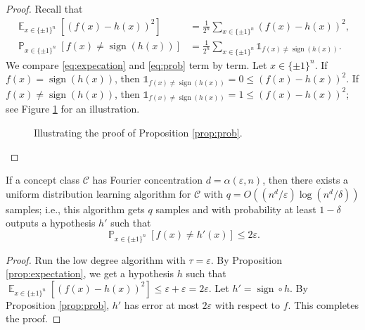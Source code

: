 \documentclass[letterpaper, reqno,11pt]{article}
\newcommand{\PP}{\mathop{{}\mathbb{P}}}
\newcommand{\EE}{\mathop{{}\mathbb{E}}}
\DeclareMathOperator{\sign}{sign}
\begin{document}
\begin{proof}
  Recall that
  \begin{align}
    \EE_{x \in \{ \pm 1 \}^n}\left[(f(x) - h(x))^2\right] &= \frac{1}{2^n} \sum_{x \in \{ \pm 1 \}^n} (f(x) - h(x))^2, \label{eq:expecation} \\
    \PP_{x \in \{ \pm 1 \}^n} \left[f(x) \neq \sign(h(x))\right] &= \frac{1}{2^n} \sum_{x \in \{ \pm 1 \}^n} \mathds 1_{f(x) \neq \sign(h(x))}. \label{eq:prob}
  \end{align}
  We compare \eqref{eq:expecation} and \eqref{eq:prob} term by term. Let $x \in \{ \pm 1 \}^n$. If $f(x) = \sign(h(x))$, then $\mathds 1_{f(x) \neq \sign(h(x))} = 0 \leq (f(x) - h(x))^2$. If $f(x) \neq \sign(h(x))$, then $\mathds 1_{f(x) \neq \sign(h(x))} = 1 \leq (f(x) - h(x))^2$; see Figure \ref{fig:proof-prob} for an illustration.

  \begin{figure}[h]
    \centering
    \caption{Illustrating the proof of Proposition \ref{prop:prob}.}
    \label{fig:proof-prob}
  \end{figure}
\end{proof}

\begin{theorem}
  If a concept class $\mathcal C$ has Fourier concentration $d = \alpha(\varepsilon, n)$, then there exists a uniform distribution learning algorithm for $\mathcal C$ with $q = O((n^d/\varepsilon) \log (n^d/\delta))$ samples; i.e., this algorithm gets $q$ samples and with probability at least $1 - \delta$ outputs a hypothesis $h'$ such that
  $$ \PP_{x \in \{ \pm 1 \}^n} \left[f(x) \neq h'(x)\right] \leq 2\varepsilon. $$
\end{theorem}

\begin{proof}
  Run the low degree algorithm with $\tau = \varepsilon$. By Proposition \ref{prop:expectation}, we get a hypothesis $h$ such that $\EE_{x \in \{ \pm 1 \}^n} [(f(x) - h(x))^2] \leq \varepsilon + \varepsilon = 2\varepsilon$. Let $h' = \sign \circ h$. By Proposition \ref{prop:prob}, $h'$ has error at most $2\varepsilon$ with respect to $f$. This completes the proof.
\end{proof}
\end{document}
